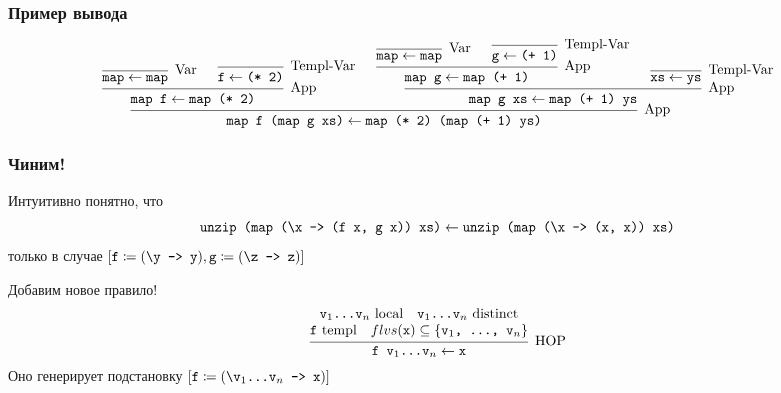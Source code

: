 \documentclass[
    aspectratio=169,
]{beamer}
\begin{document}
\begin{frame}
    \frametitle{Пример вывода}
    \begin{scriptsize}
        \[
            \begin{prooftree}
                \infer0[Var]{\text{\texttt{map}} \leftarrow \text{\texttt{map}}}
                \infer0[Templ-Var]{\text{\texttt{f}} \leftarrow \text{\texttt{(* 2)}}}
                \infer2[App]{\text{\texttt{map f}} \leftarrow \text{\texttt{map (* 2)}}}
                \infer0[Var]{\text{\texttt{map}} \leftarrow \text{\texttt{map}}}
                \infer0[Templ-Var]{\text{\texttt{g}} \leftarrow \text{\texttt{(+ 1)}}}
                \infer2[App]{\text{\texttt{map g}} \leftarrow \text{\texttt{map (+ 1)}}}
                \infer0[Templ-Var]{\text{\texttt{xs}} \leftarrow \text{\texttt{ys}}}
                \infer2[App]{\text{\texttt{map g xs}} \leftarrow \text{\texttt{map (+ 1) ys}}}
                \infer2[App]{\text{\texttt{map f (map g xs)}} \leftarrow \text{\texttt{map (* 2) (map (+ 1) ys)}}}
            \end{prooftree}
        \]
    \end{scriptsize}

\end{frame}

\begin{frame}
    \frametitle{Чиним!}

    Интуитивно понятно, что
    \[\text{\texttt{unzip (map (\textbackslash{}x -> (f x, g x)) xs)}} \leftarrow \texttt{unzip (map (\textbackslash{}x -> (x, x)) xs)}\]
    только в случае
    $\left[\text{\texttt{f}} \coloneq (\text{\texttt{\textbackslash{}y -> y}}), \text{\texttt{g}} \coloneq (\text{\texttt{\textbackslash{}z -> z}})\right]$

    \vspace{1em}
    Добавим новое правило!
    \[
        \begin{prooftree}
            \hypo{\text{\texttt{v$_1$...v$_n$} local}\quad \text{\texttt{v$_1$...v$_n$} distinct}}
            \infer[rule style=no rule]1[]{\text{\texttt{f} templ}\quad flvs(\text{\texttt{x}}) \subseteq \{\text{\texttt{v$_1$, ..., v$_n$}}\}}
            \infer1[HOP]{\text{\texttt{f v$_1$...v$_n$}} \leftarrow \text{\texttt{x}}}
        \end{prooftree}
    \]
    Оно генерирует подстановку $\left[\text{\texttt{f}} \coloneq (\text{\texttt{\textbackslash{}v$_1$...v$_n$ -> x}})\right]$
\end{frame}
\end{document}

